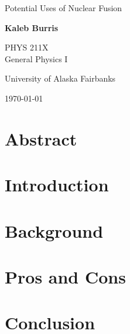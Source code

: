 \documentclass[12pt]{article}
\begin{document}
    \begin{titlepage}
        \begin{center}
            {\Huge Potential Uses of Nuclear Fusion}

            \vspace{1.5cm}

            \large \textbf{Kaleb Burris}

            \vfill

            \Large PHYS 211X \\ General Physics I

            \large University of Alaska Fairbanks
            
            \today
        \end{center}
    \end{titlepage}

    \thispagestyle{plain}

    \section{Abstract}

    \lipsum[1-2]

    \pagebreak

    \section{Introduction}

    \lipsum[3-5]

    \pagebreak

    \section{Background}

    \lipsum[6-9]

    \pagebreak

    \section{Pros and Cons}

    \lipsum[10-14]

    \pagebreak

    \section{Conclusion}

    \lipsum[15-19]

    \pagebreak

    
    
    
\end{document}
